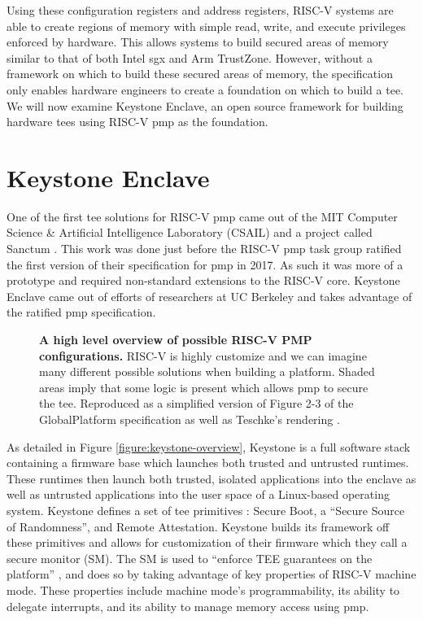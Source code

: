 Using these configuration registers and address registers, RISC-V systems are able to create regions of memory with simple read, write, and execute privileges enforced by hardware. This allows systems to build secured areas of memory similar to that of both Intel \gls{sgx} and Arm TrustZone. However, without a framework on which to build these secured areas of memory, the specification only enables hardware engineers to create a foundation on which to build a \gls{tee}. We will now examine Keystone Enclave, an open source framework for building hardware \glspl{tee} using RISC-V \gls{pmp} as the foundation.

\section{Keystone Enclave}
One of the first \gls{tee} solutions for RISC-V \gls{pmp} came out of the MIT Computer Science \& Artificial Intelligence Laboratory (CSAIL) and a project called Sanctum \cite{Costan2016a}. This work was done just before the RISC-V \gls{pmp} task group ratified the first version of their specification for \gls{pmp} in 2017. As such it was more of a prototype and required non-standard extensions to the RISC-V core. Keystone Enclave came out of efforts of researchers at UC Berkeley and takes advantage of the ratified \gls{pmp} specification.

\begin{figure}[ht]
\centering

\caption[High Level RISC-V PMP Overview]{\textbf{A high level overview of possible RISC-V PMP configurations.} RISC-V is highly customize and we can imagine many different possible solutions when building a platform. Shaded areas imply that some logic is present which allows \gls{pmp} to secure the \gls{tee}. Reproduced as a simplified version of Figure 2-3 of the GlobalPlatform specification \cite{GlobalPlatform2018} as well as Teschke's rendering \cite{TeschkeSGX}.}
\label{fig:rv-hl}
\end{figure}

As detailed in Figure \ref{figure:keystone-overview}, Keystone is a full software stack containing a firmware base which launches both trusted and untrusted runtimes. These runtimes then launch both trusted, isolated applications into the enclave as well as untrusted applications into the user space of a Linux-based operating system. Keystone defines a set of \gls{tee} primitives \cite{lee2020keystone}: Secure Boot, a ``Secure Source of Randomness'', and Remote Attestation. Keystone builds its framework off these primitives and allows for customization of their firmware which they call a secure monitor (SM). The SM is used to ``enforce TEE guarantees on the platform'' \cite{lee2019keystone}, and does so by taking advantage of key properties of RISC-V machine mode. These properties include machine mode's programmability, its ability to delegate interrupts, and its ability to manage memory access using \gls{pmp}.

